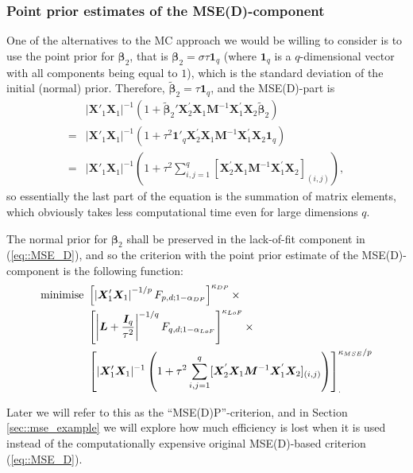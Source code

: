 \subsubsection{Point prior estimates of the MSE(D)-component}
\label{sec::mse_point}
One of the alternatives to the MC approach we would be willing to consider is to use the point prior for $\bm{\beta}_2$, that is $\bm{\beta}_2=\sigma\tau\bm{1}_q$ (where $\bm{1}_q$ is a $q$-dimensional vector with all components being equal to $1$), which is the standard deviation  of the initial (normal) prior. Therefore, $\bm{\tilde{\beta}}_2=\tau\bm{1}_q$, and the MSE(D)-part is
\begin{align*}
&|\bm{X}'_{1}\bm{X}_{1}|^{-1}(1+\bm{\tilde{\beta}}_{2}'\bm{X}_2^{'}\bm{X}_1\bm{M}^{-1}\bm{X}_1^{'}\bm{X}_2\bm{\tilde{\beta}}_{2})\\=&|\bm{X}'_{1}\bm{X}_{1}|^{-1}(1+\tau^2\bm{1}'_q\bm{X}_2^{'}\bm{X}_1\bm{M}^{-1}\bm{X}_1^{'}\bm{X}_2\bm{1}_q)\\=&|\bm{X}'_{1}\bm{X}_{1}|^{-1}\left(1+\tau^2\sum_{i,j=1}^{q}[\bm{X}_2^{'}\bm{X}_1\bm{M}^{-1}\bm{X}_1^{'}\bm{X}_2]_{(i,j)}\right),
\end{align*}
so essentially the last part of the equation is the summation of matrix elements, which obviously takes less computational time even for large dimensions $q$. 

The normal prior for $\bm{\beta}_2$ shall be preserved in the lack-of-fit component in (\ref{eq::MSE_D}), and so the criterion with the point prior estimate of the MSE(D)-component is the following function:
\begin{align}
\label{eq::MSE_D_point}
\mbox{minimise }&\left[\left|\bm{X}'_{1}\bm{X}_{1}\right|^{-1/p}F_{p,d;1-\alpha_{DP}}\right]^{\kappa_{DP}} \times \notag \\ &\left[\left|\bm{L}+\frac{\bm{I}_{q}}{\tau^{2}}\right|^{-1/q}F_{q,d;1-\alpha_{LoF}}\right]^{\kappa_{LoF}}\times \notag\\ & \left[|\bm{X}'_{1}\bm{X}_{1}|^{-1}\left(1+\tau^2\sum_{i,j=1}^{q}[\bm{X}_2^{'}\bm{X}_1\bm{M}^{-1}\bm{X}_1^{'}\bm{X}_2]_{(i,j)}\right)\right]_{.}^{\kappa_{MSE}/p}
\end{align}

Later we will refer to this as the ``MSE(D)P''-criterion, and in Section \ref{sec::mse_example} we will explore how much efficiency is lost when it is used instead of the computationally expensive original MSE(D)-based criterion (\ref{eq::MSE_D}).

